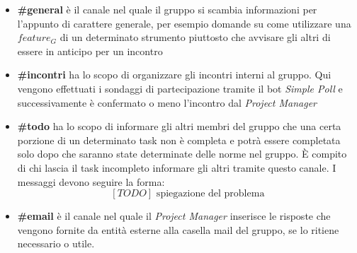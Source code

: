			\begin{itemize}
				\item \textbf{\#general} è il canale nel quale il gruppo si scambia informazioni per l'appunto di carattere generale, per esempio domande su come utilizzare una $feature_G$ di un determinato strumento piuttosto che avvisare gli altri di essere in anticipo per un incontro
				\item \textbf{\#incontri} ha lo scopo di organizzare gli incontri interni al gruppo. Qui vengono effettuati i sondaggi di partecipazione tramite il bot \emph{Simple Poll} e successivamente è confermato o meno l'incontro dal \emph{Project Manager}
				\item \textbf{\#todo} ha lo scopo di informare gli altri membri del gruppo che una certa porzione di un determinato task non è completa e potrà essere completata solo dopo che saranno state determinate delle norme nel gruppo. È compito di chi lascia il task incompleto informare gli altri tramite questo canale. I messaggi devono seguire la forma:
						$$[TODO]\text{ spiegazione del problema}$$
				\item \textbf{\#email} è il canale nel quale il \emph{Project Manager} inserisce le risposte che vengono fornite da entità esterne alla casella mail del gruppo, se lo ritiene necessario o utile.
			\end{itemize}
			
